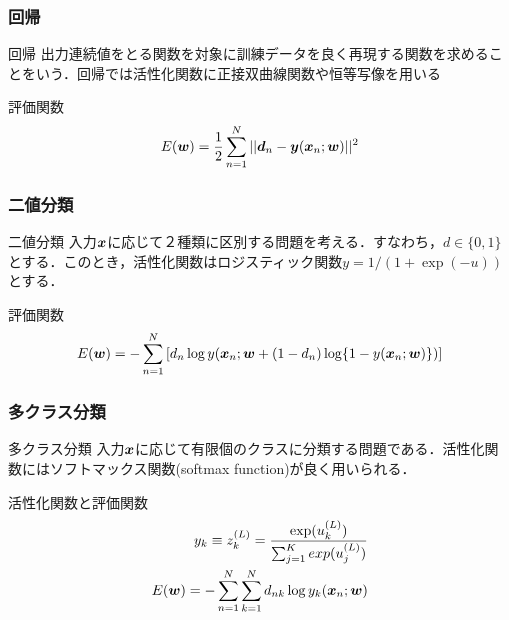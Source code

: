 \documentclass[dvipdfmx,11pt,notheorems]{beamer}
\theoremstyle{definition}
\def\vec#1{\mbox{\boldmath$#1$}}
\begin{document}
\begin{frame}[fragile]\frametitle{回帰}
\begin{block}{回帰}
出力連続値をとる関数を対象に訓練データを良く再現する関数を求めることをいう．回帰では活性化関数に正接双曲線関数や恒等写像を用いる
\end{block}
\begin{exampleblock}{評価関数}
\begin{eqnarray}
 E(\vec{w}) = \displaystyle{\frac{1}{2}}\sum^{N}_{n=1}||\vec{d}_{n}-\vec{y}(\vec{x}_{n};\vec{w})||^{2}\label{000645_27Jun15}
\end{eqnarray}
\vspace{0.1cm}
\end{exampleblock}
\end{frame}

\begin{frame}[fragile]\frametitle{二値分類}
\begin{block}{二値分類}
入力$\vec{x}$に応じて２種類に区別する問題を考える．すなわち，$d\in\{0,1\}$とする．このとき，活性化関数はロジスティック関数$y=1/(1+\exp(-u))$とする．
\end{block}
\begin{exampleblock}{評価関数}
\begin{eqnarray}
E(\vec{w})=-\sum^{N}_{n=1}\left[d_{n}\log y(\vec{x}_{n};\vec{w} + (1-d_{n})\log\{1-y(\vec{x}_{n};\vec{w})\})\right]\label{000654_27Jun15}
\end{eqnarray}
\vspace{0.1cm}
\end{exampleblock}
\end{frame}

\begin{frame}[fragile]\frametitle{多クラス分類}
\begin{block}{多クラス分類}
入力$\vec{x}$に応じて有限個のクラスに分類する問題である．活性化関数にはソフトマックス関数(softmax function)が良く用いられる．
\end{block}
\begin{exampleblock}{活性化関数と評価関数}
\begin{eqnarray}
 y_{k} \equiv z_{k}^{(L)}= \frac{\exp(u_{k}^{(L)})}{\sum^{K}_{j=1}exp(u_{j}^{(L)})} \\
E(\vec{w})=-\sum^{N}_{n=1}\sum^{N}_{k=1}d_{nk}\log y_{k}(\vec{x}_{n};\vec{w})\label{000700_27Jun15}
\end{eqnarray}
\vspace{0.1cm}
\end{exampleblock}

\end{frame}
\end{document}
